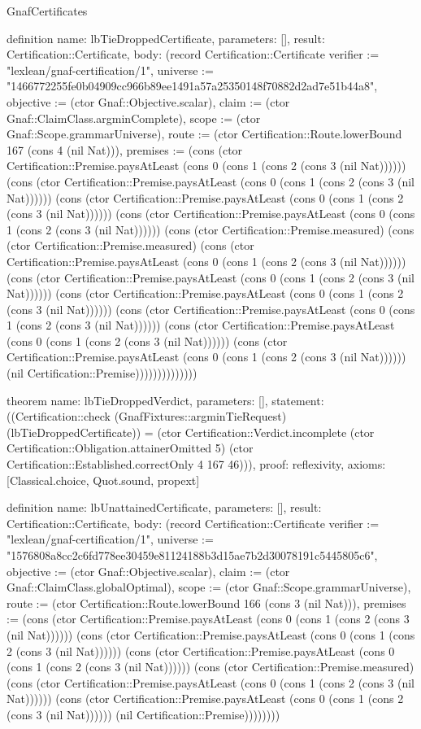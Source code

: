 \begin{lexlean}{GnafCertificates}
\begin{semanticmodule}
definition{
  name: lbTieDroppedCertificate,
  parameters: [],
  result: Certification::Certificate,
  body: (record Certification::Certificate {verifier := "lexlean/gnaf-certification/1", universe := "1466772255fe0b04909cc966b89ee1491a57a25350148f70882d2ad7e51b44a8", objective := (ctor Gnaf::Objective.scalar), claim := (ctor Gnaf::ClaimClass.argminComplete), scope := (ctor Gnaf::Scope.grammarUniverse), route := (ctor Certification::Route.lowerBound 167 (cons 4 (nil Nat))), premises := (cons (ctor Certification::Premise.paysAtLeast (cons 0 (cons 1 (cons 2 (cons 3 (nil Nat)))))) (cons (ctor Certification::Premise.paysAtLeast (cons 0 (cons 1 (cons 2 (cons 3 (nil Nat)))))) (cons (ctor Certification::Premise.paysAtLeast (cons 0 (cons 1 (cons 2 (cons 3 (nil Nat)))))) (cons (ctor Certification::Premise.paysAtLeast (cons 0 (cons 1 (cons 2 (cons 3 (nil Nat)))))) (cons (ctor Certification::Premise.measured) (cons (ctor Certification::Premise.measured) (cons (ctor Certification::Premise.paysAtLeast (cons 0 (cons 1 (cons 2 (cons 3 (nil Nat)))))) (cons (ctor Certification::Premise.paysAtLeast (cons 0 (cons 1 (cons 2 (cons 3 (nil Nat)))))) (cons (ctor Certification::Premise.paysAtLeast (cons 0 (cons 1 (cons 2 (cons 3 (nil Nat)))))) (cons (ctor Certification::Premise.paysAtLeast (cons 0 (cons 1 (cons 2 (cons 3 (nil Nat)))))) (cons (ctor Certification::Premise.paysAtLeast (cons 0 (cons 1 (cons 2 (cons 3 (nil Nat)))))) (cons (ctor Certification::Premise.paysAtLeast (cons 0 (cons 1 (cons 2 (cons 3 (nil Nat)))))) (nil Certification::Premise)))))))))))))})
}

theorem{
  name: lbTieDroppedVerdict,
  parameters: [],
  statement: ((Certification::check (GnafFixtures::argminTieRequest) (lbTieDroppedCertificate)) = (ctor Certification::Verdict.incomplete (ctor Certification::Obligation.attainerOmitted 5) (ctor Certification::Established.correctOnly 4 167 46))),
  proof: reflexivity{},
  axioms: [Classical.choice, Quot.sound, propext]
}

definition{
  name: lbUnattainedCertificate,
  parameters: [],
  result: Certification::Certificate,
  body: (record Certification::Certificate {verifier := "lexlean/gnaf-certification/1", universe := "1576808a8cc2c6fd778ee30459e81124188b3d15ae7b2d30078191c5445805c6", objective := (ctor Gnaf::Objective.scalar), claim := (ctor Gnaf::ClaimClass.globalOptimal), scope := (ctor Gnaf::Scope.grammarUniverse), route := (ctor Certification::Route.lowerBound 166 (cons 3 (nil Nat))), premises := (cons (ctor Certification::Premise.paysAtLeast (cons 0 (cons 1 (cons 2 (cons 3 (nil Nat)))))) (cons (ctor Certification::Premise.paysAtLeast (cons 0 (cons 1 (cons 2 (cons 3 (nil Nat)))))) (cons (ctor Certification::Premise.paysAtLeast (cons 0 (cons 1 (cons 2 (cons 3 (nil Nat)))))) (cons (ctor Certification::Premise.measured) (cons (ctor Certification::Premise.paysAtLeast (cons 0 (cons 1 (cons 2 (cons 3 (nil Nat)))))) (cons (ctor Certification::Premise.paysAtLeast (cons 0 (cons 1 (cons 2 (cons 3 (nil Nat)))))) (nil Certification::Premise)))))))})
}


\end{semanticmodule}
\end{lexlean}
